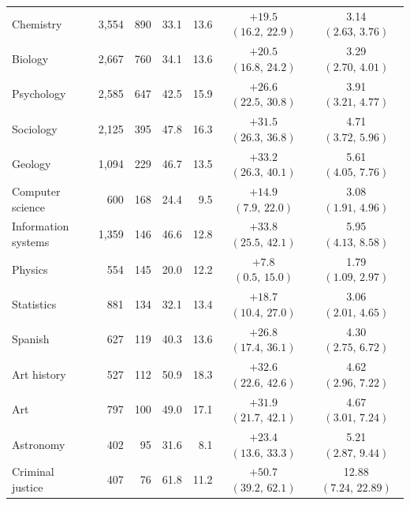 \begin{table}[tbp]
\begin{tabular}{@{}lrrrrcc@{}}
Chemistry & 3,554 & 890 & 33.1 & 13.6 & $+19.5$ $(16.2,\,22.9)$ & 3.14 $(2.63,\,3.76)$ \\
Biology & 2,667 & 760 & 34.1 & 13.6 & $+20.5$ $(16.8,\,24.2)$ & 3.29 $(2.70,\,4.01)$ \\
Psychology & 2,585 & 647 & 42.5 & 15.9 & $+26.6$ $(22.5,\,30.8)$ & 3.91 $(3.21,\,4.77)$ \\
Sociology & 2,125 & 395 & 47.8 & 16.3 & $+31.5$ $(26.3,\,36.8)$ & 4.71 $(3.72,\,5.96)$ \\
Geology & 1,094 & 229 & 46.7 & 13.5 & $+33.2$ $(26.3,\,40.1)$ & 5.61 $(4.05,\,7.76)$ \\
Computer science & 600 & 168 & 24.4 & 9.5 & $+14.9$ $(7.9,\,22.0)$ & 3.08 $(1.91,\,4.96)$ \\
Information systems & 1,359 & 146 & 46.6 & 12.8 & $+33.8$ $(25.5,\,42.1)$ & 5.95 $(4.13,\,8.58)$ \\
Physics & 554 & 145 & 20.0 & 12.2 & $+7.8$ $(0.5,\,15.0)$ & 1.79 $(1.09,\,2.97)$ \\
Statistics & 881 & 134 & 32.1 & 13.4 & $+18.7$ $(10.4,\,27.0)$ & 3.06 $(2.01,\,4.65)$ \\
Spanish & 627 & 119 & 40.3 & 13.6 & $+26.8$ $(17.4,\,36.1)$ & 4.30 $(2.75,\,6.72)$ \\
Art history & 527 & 112 & 50.9 & 18.3 & $+32.6$ $(22.6,\,42.6)$ & 4.62 $(2.96,\,7.22)$ \\
Art & 797 & 100 & 49.0 & 17.1 & $+31.9$ $(21.7,\,42.1)$ & 4.67 $(3.01,\,7.24)$ \\
Astronomy & 402 & 95 & 31.6 & 8.1 & $+23.4$ $(13.6,\,33.3)$ & 5.21 $(2.87,\,9.44)$ \\
Criminal justice & 407 & 76 & 61.8 & 11.2 & $+50.7$ $(39.2,\,62.1)$ & 12.88 $(7.24,\,22.89)$ \\
\bottomrule
\end{tabular}
\end{table}
